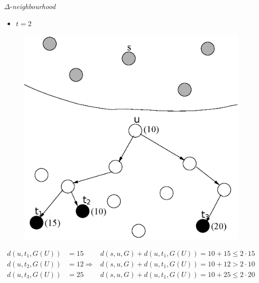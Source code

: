 \documentclass[10pt]{beamer}
\begin{document}
\begin{frame}{$\Delta$-\emph{neighbourhood}}
\begin{itemize}
  \item $t = 2$
\end{itemize}

\begin{figure}[H]
\centering
\includegraphics[scale=0.45]{imagens/neigh}
\label{fig:fig}
\end{figure}
\tiny
\begin{align*}
d(u,t_1,G(U)) &= 15 &d(s,u,G) + d(u,t_1,G(U)) = 10 + 15 \leq 2 \cdot 15 \\
d(u,t_2,G(U)) &= 12 \Rightarrow &d(s,u,G) + d(u,t_1,G(U)) = 10 + 12 > 2 \cdot 10 \\
d(u,t_3,G(U)) &= 25 &d(s,u,G) + d(u,t_1,G(U)) = 10 + 25 \leq 2 \cdot 20
\end{align*}
\end{frame}
\end{document}

